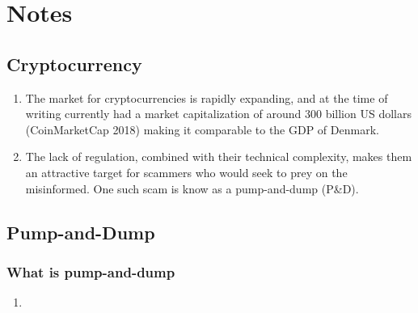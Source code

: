 \chapter{Notes}

\section{Cryptocurrency}
\begin{enumerate}
    \item The market for cryptocurrencies is rapidly expanding, and at the time of writing currently had a market capitalization of around 300 billion US dollars (CoinMarketCap 2018) making it comparable to the GDP of Denmark.
    \item The lack of regulation, combined with their technical complexity, makes them an attractive target for scammers who would seek to prey on the misinformed. One such scam is know as a pump-and-dump (P\&D).
\end{enumerate}


\section{Pump-and-Dump}
\subsection{What is pump-and-dump}
\begin{enumerate}
    \item 
\end{enumerate}

